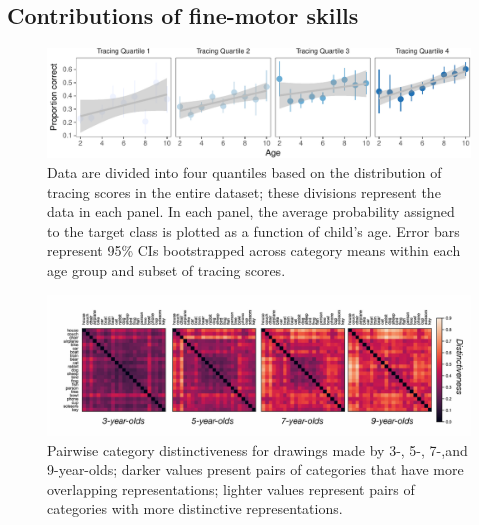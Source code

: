 \documentclass[10pt, letterpaper]{article}
\newenvironment{CodeChunk}{}{}
\begin{document}
\subsection{Contributions of fine-motor
skills}\label{contributions-of-fine-motor-skills}

\begin{CodeChunk}
\begin{figure}[h]
\includegraphics{figs/tracingResults-1} \caption[Data are divided into four quantiles based on the distribution of tracing scores in the entire dataset]{Data are divided into four quantiles based on the distribution of tracing scores in the entire dataset; these divisions represent the data in each panel. In each panel, the average probability assigned to the target class is plotted as a function of child’s age.  Error bars represent 95\% CIs bootstrapped across category means within each age group and subset of tracing scores.}\label{fig:tracingResults}
\end{figure}
\end{CodeChunk}

\begin{CodeChunk}
\begin{figure}[h]

{\centering \includegraphics{figs/distinctiveness-1} 

}

\caption[Pairwise category distinctiveness for drawings made by 3-, 5-, 7-,and 9-year-olds]{Pairwise category distinctiveness for drawings made by 3-, 5-, 7-,and 9-year-olds; darker values present pairs of categories that have more overlapping representations; lighter values represent pairs of categories with more distinctive representations.}\label{fig:distinctiveness}
\end{figure}
\end{CodeChunk}
\end{document}

